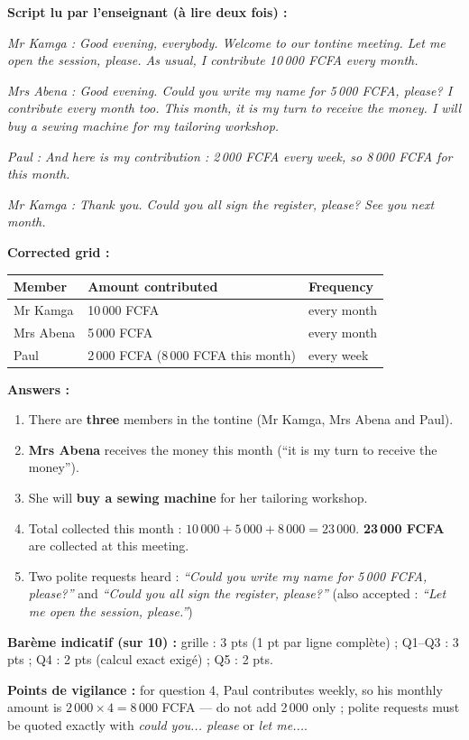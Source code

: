 \documentclass[11pt]{article}
\begin{document}
\begin{corrige}
\textbf{Script lu par l'enseignant (à lire deux fois) :}

\emph{Mr Kamga : Good evening, everybody. Welcome to our tontine meeting. Let me open the session, please. As usual, I contribute 10\,000 FCFA every month.}

\emph{Mrs Abena : Good evening. Could you write my name for 5\,000 FCFA, please? I contribute every month too. This month, it is my turn to receive the money. I will buy a sewing machine for my tailoring workshop.}

\emph{Paul : And here is my contribution : 2\,000 FCFA every week, so 8\,000 FCFA for this month.}

\emph{Mr Kamga : Thank you. Could you all sign the register, please? See you next month.}

\textbf{Corrected grid :}
\begin{center}
\begin{tabularx}{\linewidth}{|l|X|X|}
\hline
\rowcolor{popblueL} \textbf{Member} & \textbf{Amount contributed} & \textbf{Frequency} \\
\hline
Mr Kamga & 10\,000 FCFA & every month \\
\hline
Mrs Abena & 5\,000 FCFA & every month \\
\hline
Paul & 2\,000 FCFA (8\,000 FCFA this month) & every week \\
\hline
\end{tabularx}
\end{center}

\textbf{Answers :}
\begin{enumerate}
\item There are \textbf{three} members in the tontine (Mr Kamga, Mrs Abena and Paul).
\item \textbf{Mrs Abena} receives the money this month (``it is my turn to receive the money'').
\item She will \textbf{buy a sewing machine} for her tailoring workshop.
\item Total collected this month : $10\,000 + 5\,000 + 8\,000 = 23\,000$. \textbf{23\,000 FCFA} are collected at this meeting.
\item Two polite requests heard : \emph{``Could you write my name for 5\,000 FCFA, please?''} and \emph{``Could you all sign the register, please?''} (also accepted : \emph{``Let me open the session, please.''})
\end{enumerate}
\textbf{Barème indicatif (sur 10) :} grille : 3 pts (1 pt par ligne complète) ; Q1--Q3 : 3 pts ; Q4 : 2 pts (calcul exact exigé) ; Q5 : 2 pts.

\textbf{Points de vigilance :} for question 4, Paul contributes weekly, so his monthly amount is $2\,000 \times 4 = 8\,000$ FCFA — do not add 2\,000 only ; polite requests must be quoted exactly with \emph{could you... please} or \emph{let me...}.
\end{corrige}
\end{document}
